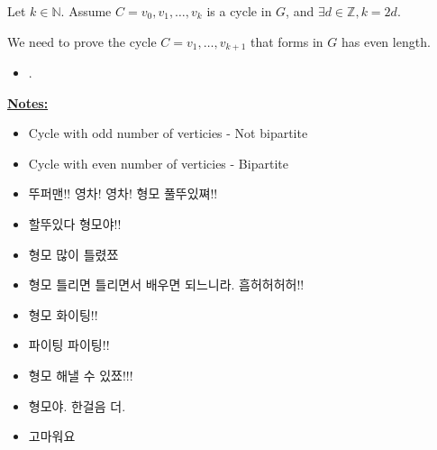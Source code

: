 \documentclass[12pt]{article}
\begin{document}
\begin{enumerate}[a.]
\begin{mdframed}
\begin{enumerate}[1.]
            \bigskip

            Let $k \in \mathbb{N}$. Assume $C=v_0,v_1,\dots,v_k$ is a cycle
            in $G$, and $\exists d \in \mathbb{Z}, k = 2d$.

            \bigskip

            We need to prove the cycle $C = v_1,\dots,v_{k+1}$ that forms in $G$
            has even length.

            \bigskip

            \begin{itemize}
                \item .
            \end{itemize}
        \end{enumerate}
    \end{mdframed}

    \underline{\textbf{Notes:}}

    \begin{itemize}
        \item Cycle with odd number of verticies - Not bipartite


        \item Cycle with even number of verticies - Bipartite


        \item 뚜퍼맨!! 영차! 영차! 형모 풀뚜있쪄!!
        \item 할뚜있다 형모야!!
        \item 형모 많이 틀렸쬬
        \item 형모 틀리면 틀리면서 배우면 되느니라. 흠허허허허!!
        \item 형모 화이팅!!
        \item 파이팅 파이팅!!
        \item 형모 해낼 수 있쬬!!!
        \item 형모야. 한걸음 더.
        \item 고마워요

    \end{itemize}

\end{enumerate}
\end{document}
